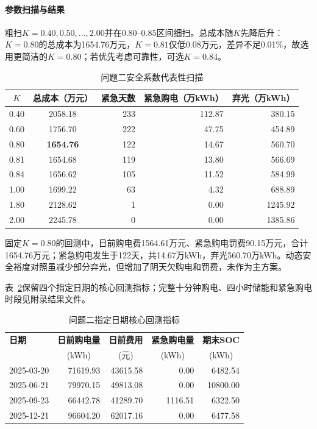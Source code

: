 \documentclass{cumcmthesis}
\begin{document}
\paragraph{参数扫描与结果}

粗扫$K=0.40,0.50,\ldots,2.00$并在$0.80$--$0.85$区间细扫。总成本随$K$先降后升：$K=0.80$的总成本为1654.76万元，$K=0.81$仅低0.08万元，差异不足0.01\%，故选用更简洁的$K=0.80$；若优先考虑可靠性，可选$K=0.84$。

\begin{table}[H]
\centering
\normalsize
\setlength{\tabcolsep}{8pt}
\renewcommand\arraystretch{1.3}
\caption{问题二安全系数代表性扫描}
\label{tab:q2scan}
\begin{tabular}{ccrrr}
\toprule
$K$ & 总成本（万元） & 紧急天数 & 紧急购电（万kWh） & 弃光（万kWh）\\
\midrule
0.40 & 2058.18 & 233 & 112.87 & 380.15\\
0.60 & 1756.70 & 222 & 47.75 & 454.89\\
0.80 & \textbf{1654.76} & 122 & 14.67 & 560.70\\
0.81 & 1654.68 & 119 & 13.80 & 566.69\\
0.84 & 1656.62 & 105 & 11.52 & 584.99\\
1.00 & 1699.22 & 63 & 4.32 & 688.89\\
1.80 & 2128.62 & 1 & 0.00 & 1245.92\\
2.00 & 2245.78 & 0 & 0.00 & 1385.86\\
\bottomrule
\end{tabular}
\end{table}

固定$K=0.80$的回测中，日前购电费1564.61万元、紧急购电罚费90.15万元，合计1654.76万元；紧急购电发生于122天，共14.67万kWh，弃光560.70万kWh。动态安全裕度对照虽减少部分弃光，但增加了阴天欠购电和罚费，未作为主方案。

表~\ref{tab:q2datesummary}保留四个指定日期的核心回测指标；完整十分钟购电、四小时储能和紧急购电时段见附录结果文件。

\begin{table}[H]
\centering
\normalsize
\setlength{\tabcolsep}{8pt}
\renewcommand\arraystretch{1.3}
\caption{问题二指定日期核心回测指标}
\label{tab:q2datesummary}
\begin{tabular}{lrrrr}
\toprule
\textbf{日期} & \textbf{日前购电量} & \textbf{日前费用} & \textbf{紧急购电量} & \textbf{期末SOC}\\
& \multicolumn{1}{c}{(kWh)} & \multicolumn{1}{c}{(元)} & \multicolumn{1}{c}{(kWh)} & \multicolumn{1}{c}{(kWh)}\\
\midrule
2025-03-20 & 71619.93 & 43615.58 & 0.00 & 6482.54\\
2025-06-21 & 79970.15 & 49813.08 & 0.00 & 10800.00\\
2025-09-23 & 66442.78 & 41289.70 & 1116.51 & 6322.50\\
2025-12-21 & 96604.20 & 62017.16 & 0.00 & 6477.58\\
\bottomrule
\end{tabular}
\end{table}
\end{document}
